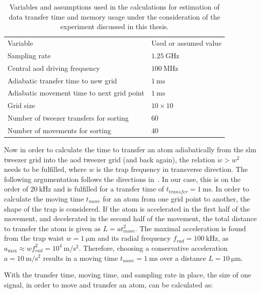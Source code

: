 \begin{table}[tb]%
\label{tbl:spectrum_assumptions}
\centering
\begin{tabular}{l l}
	\toprule \toprule
	Variable & Used or assumed value \\ \thickhline%
	Sampling rate & $\SI{1.25}{\giga\hertz}$ \\
	Central \ac{aod} driving frequency & $\SI{100}{\mega\hertz}$ \\
	Adiabatic transfer time to new grid & $\SI{1}{\milli\second}$ \\
	Adiabatic movement time to next grid point & $\SI{1}{\milli\second}$ \\
	Grid size & $10\times10$ \\
	Number of tweezer transfers for sorting & 60 \\
	Number of movements for sorting & 40 \\
	\bottomrule \bottomrule
\end{tabular}
\caption{Variables and assumptions used in the calculations for estimation of data transfer time and memory usage under the consideration of the experiment discussed in this thesis.}
\end{table}

Now in order to calculate the time to transfer an atom adiabatically from the \ac{slm} tweezer grid into the \ac{aod} tweezer grid (and back again), the relation $\dot{w} > w^2$ needs to be fulfilled, where $w$ is the trap frequency in transverse direction. The following argumentation follows the directions in~\cite{Leseleuc2018}. In our case, this is on the order of $\SI{20}{\kilo\hertz}$ and is fulfilled for a transfer time of $t_{transfer} = \SI{1}{\milli\second}$. In order to calculate the moving time $t_{move}$ for an atom from one grid point to another, the shape of the trap is considered. If the atom is accelerated in the first half of the movement, and decelerated in the second half of the movement, the total distance to transfer the atom is given as $L=a t_{move}^2$. The maximal acceleration is found from the trap waist $w = \SI{1}{\micro\meter}$ and its radial frequency $f_{rad} = \SI{100}{\kilo\hertz}$, as $a_{\max} \approx w f_{rad}^2 = 10^4\SI{}{\meter\per\second\squared}$. Therefore, choosing a conservative acceleration $a=\SI{10}{\meter\per\second\squared}$ results in a moving time $t_{move} = \SI{1}{\milli\second}$ over a distance $L=\SI{10}{\micro\meter}$.

With the transfer time, moving time, and sampling rate in place, the size of one signal, in order to move and transfer an atom, can be calculated as:

